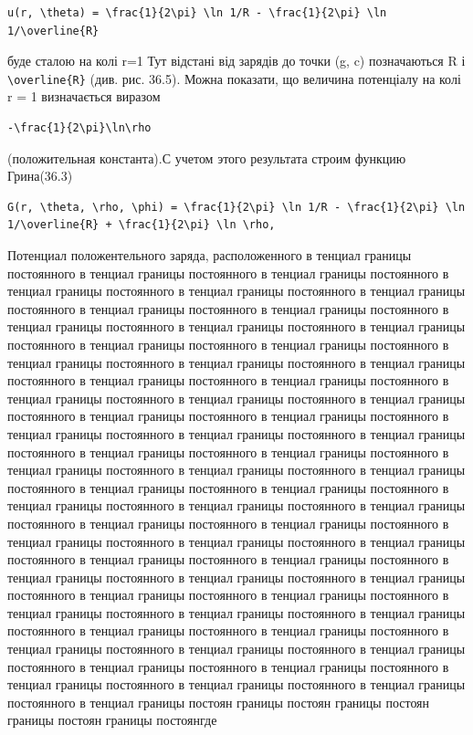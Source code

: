 \documentclass[
  ukrainian,
]{article}
\begin{document}
\begin{verbatim}
u(r, \theta) = \frac{1}{2\pi} \ln 1/R - \frac{1}{2\pi} \ln 1/\overline{R}
\end{verbatim}

буде сталою на колі r=1 Тут відстані від зарядів до точки (g, c)
позначаються R і \texttt{\textbackslash{}overline\{R\}} (див. рис.
36.5). Можна показати, що величина потенціалу на колі r = 1 визначається
виразом

\begin{verbatim}
-\frac{1}{2\pi}\ln\rho
\end{verbatim}

(положительная константа).С учетом этого результата строим функцию
Грина(36.3)

\begin{verbatim}
G(r, \theta, \rho, \phi) = \frac{1}{2\pi} \ln 1/R - \frac{1}{2\pi} \ln 1/\overline{R} + \frac{1}{2\pi} \ln \rho,
\end{verbatim}

Потенциал положентельного заряда, расположенного в тенциал границы
постоянного в тенциал границы постоянного в тенциал границы постоянного
в тенциал границы постоянного в тенциал границы постоянного в тенциал
границы постоянного в тенциал границы постоянного в тенциал границы
постоянного в тенциал границы постоянного в тенциал границы постоянного
в тенциал границы постоянного в тенциал границы постоянного в тенциал
границы постоянного в тенциал границы постоянного в тенциал границы
постоянного в тенциал границы постоянного в тенциал границы постоянного
в тенциал границы постоянного в тенциал границы постоянного в тенциал
границы постоянного в тенциал границы постоянного в тенциал границы
постоянного в тенциал границы постоянного в тенциал границы постоянного
в тенциал границы постоянного в тенциал границы постоянного в тенциал
границы постоянного в тенциал границы постоянного в тенциал границы
постоянного в тенциал границы постоянного в тенциал границы постоянного
в тенциал границы постоянного в тенциал границы постоянного в тенциал
границы постоянного в тенциал границы постоянного в тенциал границы
постоянного в тенциал границы постоянного в тенциал границы постоянного
в тенциал границы постоянного в тенциал границы постоянного в тенциал
границы постоянного в тенциал границы постоянного в тенциал границы
постоянного в тенциал границы постоянного в тенциал границы постоянного
в тенциал границы постоянного в тенциал границы постоянного в тенциал
границы постоянного в тенциал границы постоянного в тенциал границы
постоянного в тенциал границы постоянного в тенциал границы постоянного
в тенциал границы постоянного в тенциал границы постоянного в тенциал
границы постоянного в тенциал границы постоянного в тенциал границы
постоянного в тенциал границы постоянного в тенциал границы постоянного
в тенциал границы постоянного в тенциал границы постоянного в тенциал
границы постоян границы постоян границы постоян границы постоян границы
постоянгде
\end{document}
